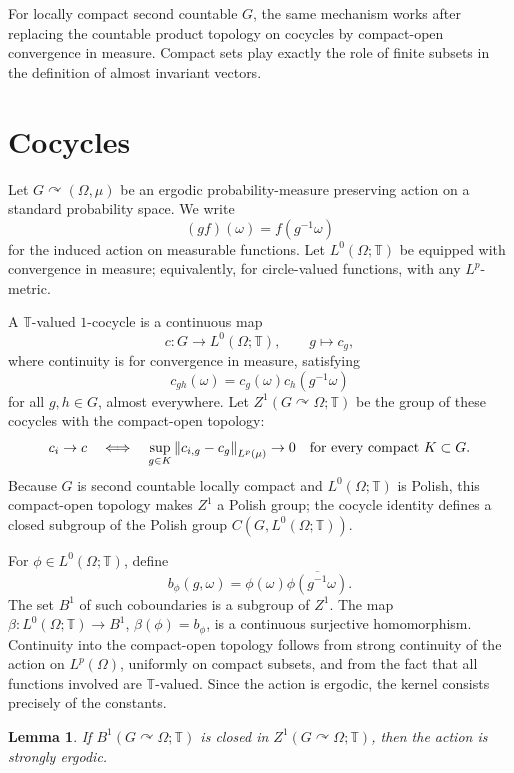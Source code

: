 \documentclass[11pt]{article}
\newtheorem{lemma}{Lemma}
\theoremstyle{definition}
\newcommand{\T}{\mathbb T}
\newcommand{\norm}[1]{\left\lVert #1\right\rVert}
\begin{document}
For locally compact second countable \(G\), the same mechanism works after
replacing the countable product topology on cocycles by compact-open
convergence in measure.  Compact sets play exactly the role of finite subsets
in the definition of almost invariant vectors.

\section*{Cocycles}

Let \(G\curvearrowright (\Omega,\mu)\) be an ergodic probability-measure
preserving action on a standard probability space.  We write
\[
   (g f)(\omega)=f(g^{-1}\omega)
\]
for the induced action on measurable functions.  Let \(L^0(\Omega;\T)\) be
equipped with convergence in measure; equivalently, for circle-valued
functions, with any \(L^p\)-metric.

A \(\T\)-valued \(1\)-cocycle is a continuous map
\[
   c:G\to L^0(\Omega;\T),\qquad g\mapsto c_g,
\]
where continuity is for convergence in measure, satisfying
\[
   c_{gh}(\omega)=c_g(\omega)c_h(g^{-1}\omega)
\]
for all \(g,h\in G\), almost everywhere.  Let \(Z^1(G\curvearrowright
\Omega;\T)\) be the group of these cocycles with the compact-open topology:
\[
   c_i\to c
   \quad\Longleftrightarrow\quad
   \sup_{g\in K}\norm{c_{i,g}-c_g}_{L^p(\mu)}\to0
   \quad\hbox{for every compact }K\subset G.
\]
Because \(G\) is second countable locally compact and \(L^0(\Omega;\T)\) is
Polish, this compact-open topology makes \(Z^1\) a Polish group; the cocycle
identity defines a closed subgroup of the Polish group \(C(G,L^0(\Omega;\T))\).

For \(\phi\in L^0(\Omega;\T)\), define
\[
   b_\phi(g,\omega)=\phi(\omega)\overline{\phi(g^{-1}\omega)} .
\]
The set \(B^1\) of such coboundaries is a subgroup of \(Z^1\).  The map
\(\beta:L^0(\Omega;\T)\to B^1\), \(\beta(\phi)=b_\phi\), is a continuous
surjective homomorphism.  Continuity into the compact-open topology follows
from strong continuity of the action on \(L^p(\Omega)\), uniformly on compact
subsets, and from the fact that all functions involved are \(\T\)-valued.
Since the action is ergodic, the kernel consists precisely of the constants.

\begin{lemma}\label{lem:closed-strong}
If \(B^1(G\curvearrowright\Omega;\T)\) is closed in \(Z^1(G\curvearrowright
\Omega;\T)\), then the action is strongly ergodic.
\end{lemma}
\end{document}

